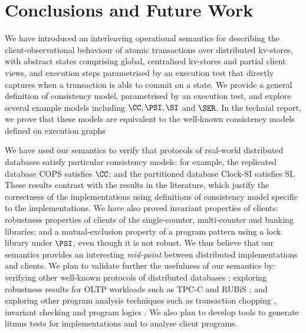 

\section{Conclusions and Future Work}
\label{sec:conclusions}

We have introduced an  interleaving operational semantics for
describing the client-observational behaviour of atomic
transactions over distributed kv-stores, with abstract states 
comprising global, centralised kv-stores and  partial
client views, and execution steps parametrised by an execution test
that directly 
captures  when a transaction is able  to commit on a state.
We provide a general
definition of consistency model, parametrised by an execution test,
and explore several example models including  \( \CC, \PSI, \SI \) and \( \SER \).
In the technial report, we prove  that  these models are 
equivalent to the 
well-known consistency models defined on  execution graphs \cite{adya,ev_transactions}

\begin{app}
We have used our semantics to verify that protocols of real-world
distributed databases satisfy particular consistency models: for
example, the replicated database COPS \cite{cops} satisfies \(\CC\); and the
partitioned database Clock-SI \cite{clocksi} satisfies SI. These results
contrast with the results in the literature, which justify the
correctness of the implementations using definitions of consistency
model specific to the implementations.  We have also proved invariant
properties of clients: robustness properties of clients of the
single-counter, multi-counter and banking libraries; and a
mutual-exclusion property of a program pattern using a lock library
under \( \PSI \), even though it is not robust.  We thus believe that our
semantics provides an interesting \emph{mid-point} between distributed
implementations and clients.  We plan to validate further the
usefulness of our semantics by: verifying other well-known protocols
of distributed databases \cite{ramp,redblue,eiger,wren}; exploring
robustness results for OLTP workloads such as TPC-C \cite{tpcc} and
RUBiS \cite{rubis}; and exploring other program analysis techniques
such as transaction chopping \cite{psi-chopping,chopping}, invariant
checking \cite{cise,repliss} and program logics \cite{alonetogether}.
We also plan to develop tools to generate litmus tests for
implementations and to analyse client programs.
\end{app}

